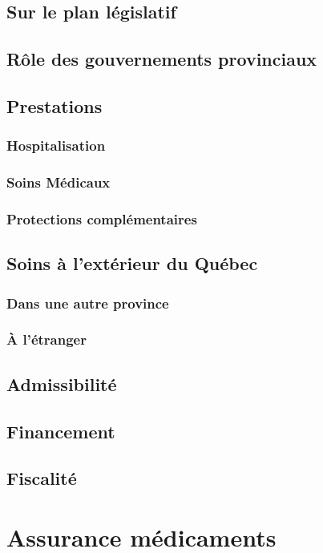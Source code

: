 \documentclass[10pt, french]{article}
\begin{document}
\begin{multicols*}{3}
\subsection*{Sur le plan législatif}
\subsection*{Rôle des gouvernements provinciaux}
\subsection*{Prestations}
	\subsubsection*{Hospitalisation}
	\subsubsection*{Soins Médicaux}
	\subsubsection*{Protections complémentaires}
\subsection*{Soins à l'extérieur du Québec}
	\subsubsection*{Dans une autre province}
	\subsubsection*{À l'étranger}
\subsection*{Admissibilité}
\subsection*{Financement}
\subsection*{Fiscalité}


\newpage

\section{Assurance médicaments}


\end{multicols*}
\end{document}
